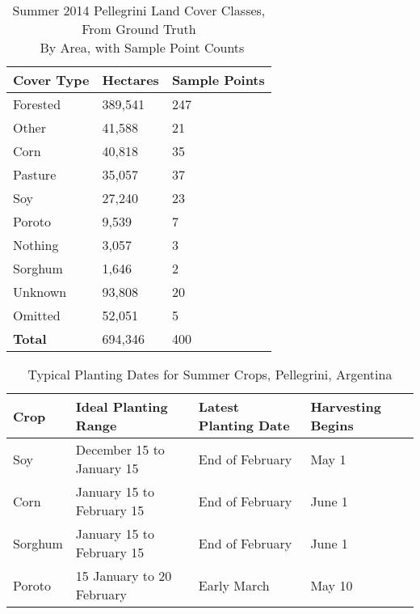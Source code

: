 
\begin{Spacing}{1.0}
\begin{table}
  \centering
  \caption[Summer 2014 Pellegrini Land Cover Classes, From Ground Truth]{Summer 2014 Pellegrini Land Cover Classes, From Ground Truth\\~By Area, with Sample Point Counts}
  \label{table:pellegrini:LCarea}
  \begin{tabu}{XX[r]X[r]}
    \toprule
    \textbf{Cover Type} & \textbf{Hectares} & \textbf{Sample Points} \\
    \midrule
    Forested & 389,541 & 247 \\
    Other & 41,588 & 21 \\
    Corn & 40,818 & 35 \\
    Pasture & 35,057 & 37 \\
    Soy & 27,240 & 23 \\
    Poroto & 9,539 & 7 \\
    Nothing & 3,057 & 3 \\
    Sorghum & 1,646 & 2 \\
    \midrule
    Unknown & 93,808 & 20 \\
    Omitted & 52,051 & 5 \\
    \midrule
    \textbf{Total} & 694,346 & 400 \\
    \bottomrule
  \end{tabu}
\end{table}
\end{Spacing}


\begin{Spacing}{1.0}
\begin{table}
  \centering
  \caption{Typical Planting Dates for Summer Crops, Pellegrini, Argentina}
  \label{table:plantingdates}
  \begin{tabu}{X[0.45,m,c]X[1,m,c]X[.95,m,c]X[0.5,m,c]}
    \toprule
    \textbf{Crop} & \textbf{Ideal Planting Range} & \textbf{Latest Planting Date} & \textbf{Harvesting Begins} \\
    \midrule
    Soy & December 15 to January 15 & End of February & May 1 \\
    Corn & January 15 to February 15 & End of February & June 1 \\
    Sorghum & January 15 to February 15 & End of February & June 1 \\
    Poroto & 15 January to 20 February & Early March & May 10 \\
    \bottomrule
  \end{tabu}
\end{table}
\end{Spacing}


